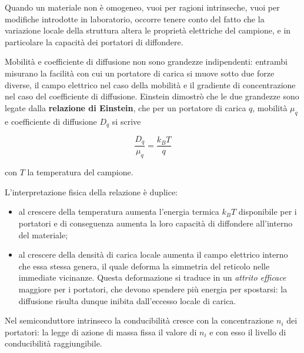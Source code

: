 Quando un materiale non è omogeneo, vuoi per ragioni intrinseche, vuoi per modifiche introdotte in laboratorio, occorre tenere conto del fatto che la variazione locale della struttura altera le proprietà elettriche del campione, e in particolare la capacità dei portatori di diffondere.

Mobilità e coefficiente di diffusione non sono grandezze indipendenti: entrambi misurano la facilità con cui un portatore di carica si muove sotto due forze diverse, il campo elettrico nel caso della mobilità e il gradiente di concentrazione nel caso del coefficiente di diffusione. Einstein dimostrò che le due grandezze sono legate dalla \textbf{relazione di Einstein}, che per un portatore di carica \( q \), mobilità \( \mu_q \) e coefficiente di diffusione \( D_q \) si scrive
\begin{importantbox}
    \begin{equation}
        \frac{D_q}{\mu_q} = \frac{k_B T}{q}
    \end{equation}
\end{importantbox}
con \( T \) la temperatura del campione.

L'interpretazione fisica della relazione è duplice:
\begin{itemize}
    \item al crescere della temperatura aumenta l'energia termica \( k_B T \) disponibile per i portatori e di conseguenza aumenta la loro capacità di diffondere all'interno del materiale;
    \item al crescere della densità di carica locale aumenta il campo elettrico interno che essa stessa genera, il quale deforma la simmetria del reticolo nelle immediate vicinanze. Questa deformazione si traduce in un \emph{attrito efficace} maggiore per i portatori, che devono spendere più energia per spostarsi: la diffusione risulta dunque inibita dall'eccesso locale di carica.
\end{itemize}

Nel semiconduttore intrinseco la conducibilità cresce con la concentrazione \( n_i \) dei portatori: la legge di azione di massa fissa il valore di \( n_i \) e con esso il livello di conducibilità raggiungibile.

